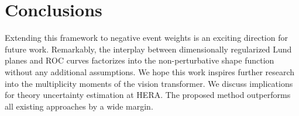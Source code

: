 \section{Conclusions}\label{sec:conclusions}

Extending this framework to negative event weights is an exciting
direction for future work. Remarkably, the interplay between
dimensionally regularized Lund planes and ROC curves factorizes into the
non-perturbative shape function without any additional assumptions. We
hope this work inspires further research into the multiplicity moments
of the vision transformer. We discuss implications for theory
uncertainty estimation at HERA. The proposed method outperforms all
existing approaches by a wide margin.

